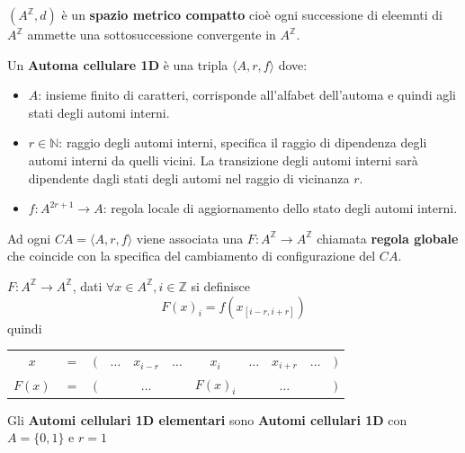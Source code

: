 \begin{nota} 
    $(A^\mathbb{Z}, d)$ è un \textbf{spazio metrico compatto} cioè ogni successione
    di eleemnti di $A^\mathbb{Z}$ ammette una sottosuccessione convergente in $A^\mathbb{Z}$.
\end{nota}
\begin{definizione} 
    Un \textbf{Automa cellulare 1D}  è una tripla $\langle A, r, f\rangle$
    dove:
    \begin{itemize}
        \item $A$: insieme finito di caratteri, corrisponde all'alfabet dell'automa e
              quindi agli stati degli automi interni.
        \item $r\in \mathbb{N}$: raggio degli automi interni, specifica il raggio
              di dipendenza degli automi interni da quelli vicini. La transizione degli
              automi interni sarà dipendente dagli stati degli automi nel raggio
              di vicinanza $r$.
        \item $f: A^{2r+1}\rightarrow A$: regola locale di aggiornamento dello
              stato degli automi interni.
    \end{itemize}
\end{definizione}
Ad ogni $CA = \langle A, r, f\rangle$ viene associata una $F:A^\mathbb{Z}\rightarrow A^\mathbb{Z}$
chiamata \textbf{regola globale} che coincide con la specifica del cambiamento
di configurazione del $CA$.
\begin{definizione} 
    $F:A^\mathbb{Z}\rightarrow A^\mathbb{Z}$, dati $\forall x \in A^\mathbb{Z}, i \in \mathbb{Z}$
    si definisce
    $$F(x)_i = f(x_{[i-r, i+r]})$$
    quindi
    \begin{table}[!h]
        \centering
        \begin{tabular}{ccccccccccc}
            $x$    & $=$ & $($ & $\dots$                     & $x_{i-r}$ & $\dots$                     & $x_i$ & $\dots$ & $x_{i+r}$ & $\dots$ & $)$ \\
            $F(x)$ & $=$ & $($ & \multicolumn{3}{c}{$\dots$} & $F(x)_i$  & \multicolumn{3}{c}{$\dots$} & $)$
        \end{tabular}
    \end{table}
\end{definizione}
\begin{definizione} 
    Gli \textbf{Automi cellulari 1D elementari} sono \textbf{Automi cellulari 1D}
    con $A=\{0,1\}$ e $r=1$
\end{definizione}

